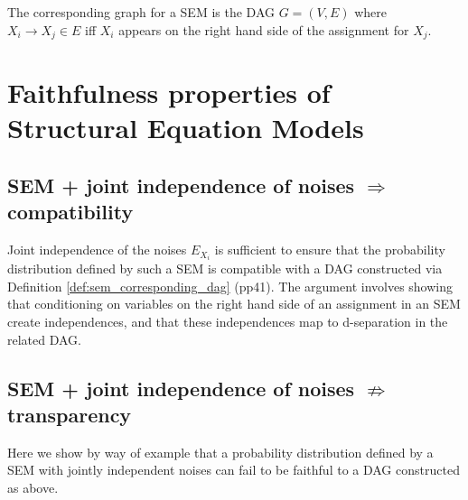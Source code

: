 \begin{definition}\label{def:sem_corresponding_dag}
The corresponding graph for a SEM is the DAG $G=(V,E)$ where $X_i\to X_j\in E$ iff $X_i$ appears on the right hand side of the assignment for $X_j$.
\end{definition}

\section{Faithfulness properties of Structural Equation Models}

\subsection{SEM + joint independence of noises $\Rightarrow$ compatibility}

Joint independence of the noises $E_{X_i}$ is sufficient to ensure that the probability distribution defined by such a SEM is compatible with a DAG constructed via Definition \ref{def:sem_corresponding_dag} \cite{spirtes_causation_1993} (pp41). The argument involves showing that conditioning on variables on the right hand side of an assignment in an SEM create independences, and that these independences map to d-separation in the related DAG.

\subsection{SEM + joint independence of noises $\not\Rightarrow$ transparency}

Here we show by way of example that a probability distribution defined by a SEM with jointly independent noises can fail to be faithful to a DAG constructed as above.

